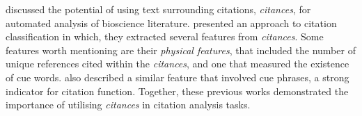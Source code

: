  discussed the potential of using text surrounding citations, \textit{citances}, for automated analysis of bioscience literature.
 presented an approach to citation classification in which, they extracted several features from \textit{citances}. Some features worth mentioning are their \textit{physical features}, that included the number of unique references cited within the \textit{citances}, and one that measured the existence of cue words.  also described a similar feature that involved cue phrases, a strong indicator for citation function. Together, these previous works demonstrated the importance of utilising \textit{citances} in citation analysis tasks.


